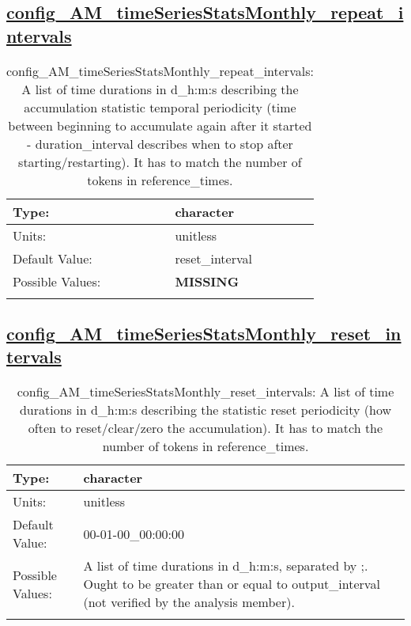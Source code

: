 \subsection[config\_AM\_timeSeriesStatsMonthly\_repeat\_intervals]{\hyperref[sec:nm_tab_AM_timeSeriesStatsMonthly]{config\_AM\_timeSeriesStatsMonthly\_repeat\_intervals}}
\label{subsec:nm_sec_config_AM_timeSeriesStatsMonthly_repeat_intervals}
\begin{center}
\begin{longtable}{| p{2.0in} || p{4.0in} |}
    \hline
    Type: & character \\
    \hline
    Units: & \si{unitless} \\
    \hline
    Default Value: & reset\_interval \\
    \hline
    Possible Values: & {\bf \color{red} MISSING} \\
    \hline
    \caption{config\_AM\_timeSeriesStatsMonthly\_repeat\_intervals: A list of time durations in d\_h:m:s describing the accumulation statistic temporal periodicity (time between beginning to accumulate again after it started - duration\_interval describes when to stop after starting/restarting). It has to match the number of tokens in reference\_times.}
\end{longtable}
\end{center}
\subsection[config\_AM\_timeSeriesStatsMonthly\_reset\_intervals]{\hyperref[sec:nm_tab_AM_timeSeriesStatsMonthly]{config\_AM\_timeSeriesStatsMonthly\_reset\_intervals}}
\label{subsec:nm_sec_config_AM_timeSeriesStatsMonthly_reset_intervals}
\begin{center}
\begin{longtable}{| p{2.0in} || p{4.0in} |}
    \hline
    Type: & character \\
    \hline
    Units: & \si{unitless} \\
    \hline
    Default Value: & 00-01-00\_00:00:00 \\
    \hline
    Possible Values: & A list of time durations in d\_h:m:s, separated by ;. Ought to be greater than or equal to output\_interval (not verified by the analysis member). \\
    \hline
    \caption{config\_AM\_timeSeriesStatsMonthly\_reset\_intervals: A list of time durations in d\_h:m:s describing the statistic reset periodicity (how often to reset/clear/zero the accumulation). It has to match the number of tokens in reference\_times.}
\end{longtable}
\end{center}
